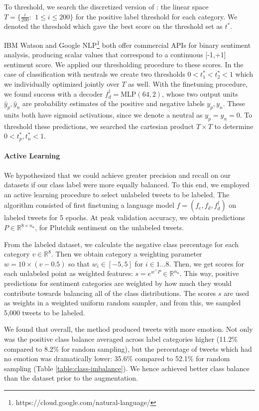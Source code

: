 \documentclass[letterpaper]{article} %
\begin{document}
To threshold, we search the discretized version of \text{[0, 1]}: the linear space $T = \{ \frac{i}{200}: \, \: 1 \le i \le 200 \}$ for the positive label threshold for each category. We denoted the threshold which gave the best score on the threshold set as $t^*$. 

IBM Watson and Google NLP\footnote{https://cloud.google.com/natural-language/} both offer commercial APIs for binary sentiment analysis, producing scalar values that correspond to a continuous [-1,+1] sentiment score. We applied our thresholding procedure to these scores. In the case of classification with neutrals we create two thresholds $0 < t_1^* < t_2^* < 1$ which we individually optimized jointly over $T$ as well. With the finetuning procedure, we found success with a decoder $f_d^{\dagger} = \text{MLP}(64, 2)$, whose two output units $\hat{y}_p, \hat{y}_n$ are probability estimates of the positive and negative labels $y_p, y_n$. These units both have sigmoid activations, since we denote a neutral as $y_p = y_n = 0$. To threshold these predictions, we searched the cartesian product $T \times T$ to determine $0 < t_p^*, t_n^* < 1$. 

\paragraph{Active Learning}
We hypothesized that we could achieve greater precision and recall on our datasets if our class label were more equally balanced. To this end, we employed an active learning procedure to select unlabeled tweets to be labeled. The algorithm consisted of first finetuning a language model $f = (f_e, f_d, f_d^{\dagger})$ on labeled tweets for 5 epochs. At peak validation accuracy, we obtain predictions $P \in \mathbb{R}^{8 \times n_{u}}$, for Plutchik sentiment on the unlabeled tweets. 

From the labeled dataset, we calculate the negative class percentage for each category $v \in \mathbb{R}^{8}$. Then we obtain category a weighting parameter $w = 10 \times (v - 0.5)$ so that $w_i \in [-5, 5]$ for $i \in 1\ldots8.$ Then, we get scores for each unlabeled point as weighted features: $s = e^{w^{\top}P} \in \mathbb{R}^{n_u}$. This way, positive predictions for sentiment categories are weighted by how much they would contribute towards balancing all of the class distributions. The scores $s$ are used as weights in a weighted uniform random sampler, and from this, we sampled 5,000 tweets to be labeled. 

We found that overall, the method produced tweets with more emotion. Not only was the positive class balance averaged across label categories higher (11.2\% compared to 8.2\% for random sampling),  but the percentage of tweets which had no emotion was dramatically lower: 35.6\% compared to 52.1\% for random sampling (Table \ref{table:class-imbalance}). We hence achieved better class balance than the dataset prior to the augmentation. 
\end{document}
